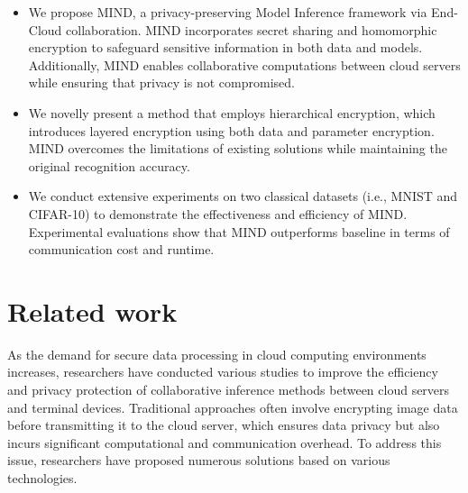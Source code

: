 \documentclass[conference]{IEEEtran}
\begin{document}
\begin{itemize}
    \item We propose MIND, a privacy-preserving Model Inference framework via End-Cloud collaboration. MIND incorporates secret sharing and homomorphic encryption to safeguard sensitive information in both data and models. Additionally, MIND enables collaborative computations between cloud servers while ensuring that privacy is not compromised.
    
    \item We novelly present a method that employs hierarchical encryption, which introduces layered encryption using both data and parameter encryption. MIND overcomes the limitations of existing solutions while maintaining the original recognition accuracy.
    
    \item We conduct extensive experiments on two classical datasets (i.e., MNIST and CIFAR-10) to demonstrate the effectiveness and efficiency of MIND. Experimental evaluations show that MIND outperforms baseline in terms of communication cost and runtime.  
\end{itemize}
\section{Related work}
As the demand for secure data processing in cloud computing environments increases, researchers have conducted various studies to improve the efficiency and privacy protection of collaborative inference methods between cloud servers and terminal devices. Traditional approaches often involve encrypting image data before transmitting it to the cloud server, which ensures data privacy but also incurs significant computational and communication overhead. To address this issue, researchers have proposed numerous solutions based on various technologies.
\end{document}
